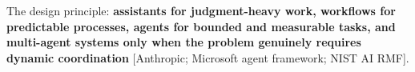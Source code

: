 The design principle: \textbf{assistants for judgment-heavy work, workflows
for predictable processes, agents for bounded and measurable tasks, and
multi-agent systems only when the problem genuinely requires dynamic
coordination} [Anthropic; Microsoft agent framework; NIST AI RMF].

